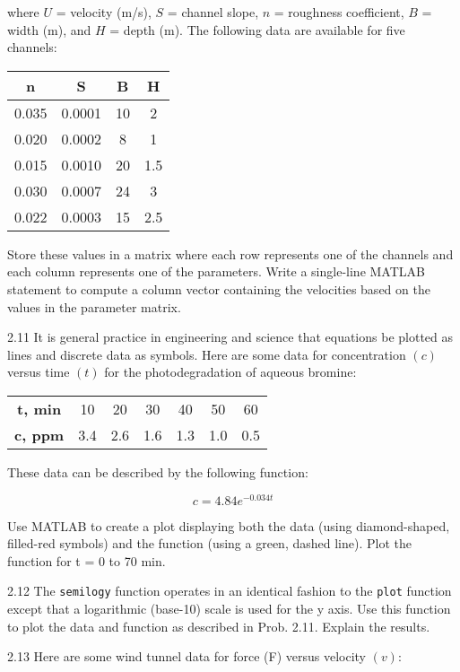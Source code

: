 \documentclass[../main.tex]{subfiles}
\begin{document}
\begin{multicols}{2}
where $U$ = velocity (m/s), $S$ = channel slope, $n$ = roughness
coefficient, $B$ = width (m), and $H$ = depth (m). The following data are available for five channels:


\begin{tabular}{cccc}
	\hline
	\textbf{n}&\textbf{S}&\textbf{B}&\textbf{H}\\
	\hline
		0.035 &0.0001 &10 &2\\
		0.020 &0.0002 &8 &1\\
		0.015 &0.0010 &20 &1.5\\
		0.030 &0.0007 &24 &3\\
		0.022 &0.0003 &15 &2.5\\

	\hline
\end{tabular}


Store these values in a matrix where each row represents one
of the channels and each column represents one of the parameters. Write a single-line MATLAB statement to compute a
column vector containing the velocities based on the values
in the parameter matrix.


2.11 It is general practice in engineering and science that
equations be plotted as lines and discrete data as symbols.
Here are some data for concentration $(c)$ versus time $(t)$ for
the photodegradation of aqueous bromine:


\begin{tabular}{ccccccc}
	\hline

	\textbf{t, min} &10 &20 &30 &40 &50 &60\\
	\textbf{c, ppm} &3.4 &2.6 &1.6 &1.3 &1.0 &0.5\\

	\hline
\end{tabular}


These data can be described by the following function:

$$ c=4.84e^{-0.034t}$$

Use MATLAB to create a plot displaying both the data
(using diamond-shaped, filled-red symbols) and the function
(using a green, dashed line). Plot the function for t = 0 to
70 min.


2.12 The \texttt{semilogy} function operates in an identical fashion
to the \texttt{plot} function except that a logarithmic (base-10) scale
is used for the y axis. Use this function to plot the data and
function as described in Prob. 2.11. Explain the results.


2.13 Here are some wind tunnel data for force (F) versus
velocity $(v)$:


\end{multicols}
\end{document}
